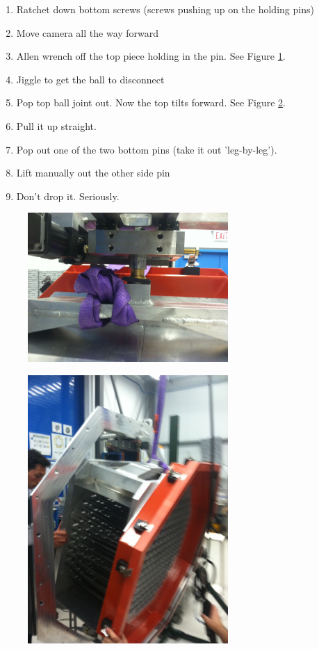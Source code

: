 \documentclass[11pt]{article}
\begin{document}
\begin{enumerate}
\item Ratchet down bottom screws (screws pushing up on the holding pins)
\item Move camera all the way forward
\item Allen wrench off the top piece holding in the pin.  See Figure \ref{figRemove1}.
\item Jiggle to get the ball to disconnect
\item Pop top ball joint out.  Now the top tilts forward.  See Figure \ref{figRemove2}.
\item Pull it up straight.
\item Pop out one of the two bottom pins (take it out 'leg-by-leg'). 
\item Lift manually out the other side pin
\item Don't drop it.  Seriously.
\end{enumerate}

\begin{figure}[h]
\begin{center}
\includegraphics[width = 3in]{photo_2.png}
\end{center}
\caption{}  
\label{figRemove1}
\end{figure}


\begin{figure}[h]
\begin{center}
\includegraphics[width = 3in]{photo_3.png}
\end{center}
\caption{}  
\label{figRemove2}
\end{figure}
\end{document}
